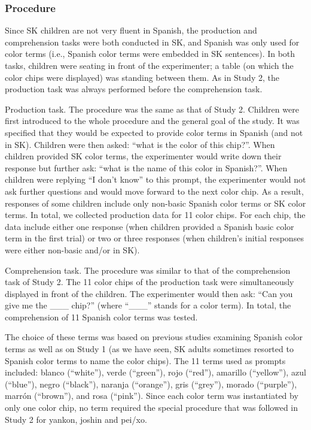 \documentclass[man]{apa6}
\theoremstyle{definition}
\theoremstyle{definition}
\theoremstyle{definition}
\theoremstyle{remark}
\begin{document}
\subsubsection{Procedure}\label{procedure-2}

Since SK children are not very fluent in Spanish, the production and
comprehension tasks were both conducted in SK, and Spanish was only used
for color terms (i.e., Spanish color terms were embedded in SK
sentences). In both tasks, children were seating in front of the
experimenter; a table (on which the color chips were displayed) was
standing between them. As in Study 2, the production task was always
performed before the comprehension task.

Production task. The procedure was the same as that of Study 2. Children
were first introduced to the whole procedure and the general goal of the
study. It was specified that they would be expected to provide color
terms in Spanish (and not in SK). Children were then asked:
\enquote{what is the color of this chip?}. When children provided SK
color terms, the experimenter would write down their response but
further ask: \enquote{what is the name of this color in Spanish?}. When
children were replying \enquote{I don't know} to this prompt, the
experimenter would not ask further questions and would move forward to
the next color chip. As a result, responses of some children include
only non-basic Spanish color terms or SK color terms. In total, we
collected production data for 11 color chips. For each chip, the data
include either one response (when children provided a Spanish basic
color term in the first trial) or two or three responses (when
children's initial responses were either non-basic and/or in SK).

Comprehension task. The procedure was similar to that of the
comprehension task of Study 2. The 11 color chips of the production task
were simultaneously displayed in front of the children. The experimenter
would then ask: \enquote{Can you give me the \_\_\_ chip?} (where
``\_\_\_'' stands for a color term). In total, the comprehension of 11
Spanish color terms was tested.

The choice of these terms was based on previous studies examining
Spanish color terms as well as on Study 1 (as we have seen, SK adults
sometimes resorted to Spanish color terms to name the color chips). The
11 terms used as prompts included: blanco (\enquote{white}), verde
(\enquote{green}), rojo (\enquote{red}), amarillo (\enquote{yellow}),
azul (\enquote{blue}), negro (\enquote{black}), naranja
(\enquote{orange}), gris (\enquote{grey}), morado (\enquote{purple}),
marrón (\enquote{brown}), and rosa (\enquote{pink}). Since each color
term was instantiated by only one color chip, no term required the
special procedure that was followed in Study 2 for yankon, joshin and
pei/xo.
\end{document}
